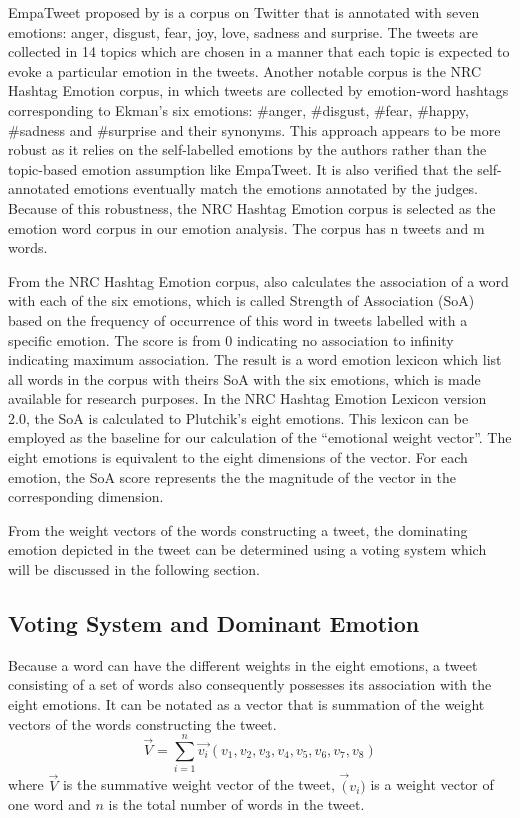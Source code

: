EmpaTweet proposed by \citet{roberts2012empatweet} is a corpus on Twitter that is annotated with seven emotions: anger, disgust, fear, joy, love, sadness and surprise. The tweets are collected in 14 topics which are chosen in a manner that each topic is expected to evoke a particular emotion in the tweets. Another notable corpus is the NRC Hashtag Emotion corpus, in which tweets are collected by emotion-word hashtags corresponding to Ekman's six emotions: \#anger, \#disgust, \#fear, \#happy, \#sadness and \#surprise and their synonyms\citep{mohammad2012emotional}. This approach appears to be more robust as it relies on the self-labelled emotions by the authors rather than the topic-based emotion assumption like EmpaTweet. It is also verified that the self-annotated emotions eventually match the emotions annotated by the judges. Because of this robustness, the NRC Hashtag Emotion corpus is selected as the emotion word corpus in our emotion analysis. The corpus has n tweets and m words.

From the NRC Hashtag Emotion corpus, \citet{mohammad2012emotional} also calculates the association of a word with each of the six emotions, which is called Strength of Association (SoA) based on the frequency of occurrence of this word in tweets labelled with a specific emotion. The score is from 0 indicating no association to infinity indicating maximum association. The result is a word emotion lexicon which list all words in the corpus with theirs SoA with the six emotions, which is made available for research purposes. In the NRC Hashtag Emotion Lexicon version 2.0, the SoA is calculated to Plutchik's eight emotions. This lexicon can be employed as the baseline for our calculation of the ``emotional weight vector''. The eight emotions is equivalent to the eight dimensions of the vector. For each emotion, the SoA score represents the the magnitude of the vector in the corresponding dimension.

From the weight vectors of the words constructing a tweet, the dominating emotion depicted in the tweet can be determined using a voting system which will be discussed in the following section.

\subsection{Voting System and Dominant Emotion}
Because a word can have the different weights in the eight emotions, a tweet consisting of a set of words also consequently possesses its association with the eight emotions. It can be notated as a vector that is summation of the weight vectors of the words constructing the tweet.
\[
	\vec{V} = \sum_{i=1}^{n} \vec{v_i}(v_1, v_2, v_3, v_4, v_5, v_6, v_7, v_8)
\]
where \(\vec{V}\) is the summative weight vector of the tweet, \(\vec(v_i)\) is a weight vector of one word and \(n\) is the total number of words in the tweet.

